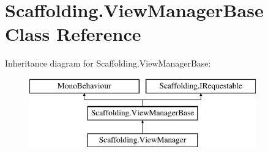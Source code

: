 \hypertarget{class_scaffolding_1_1_view_manager_base}{\section{Scaffolding.\+View\+Manager\+Base Class Reference}
\label{class_scaffolding_1_1_view_manager_base}
}
Inheritance diagram for Scaffolding.\+View\+Manager\+Base\+:\begin{figure}[H]
\begin{center}
\leavevmode
\includegraphics[height=3.000000cm]{class_scaffolding_1_1_view_manager_base}
\end{center}
\end{figure}

